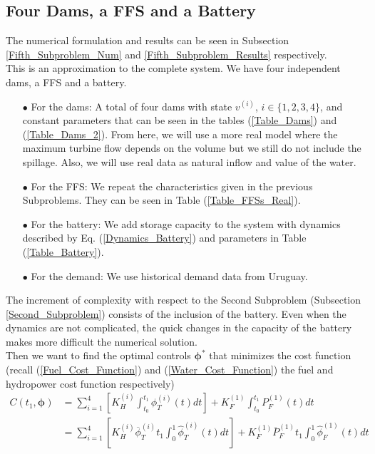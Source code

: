 \subsection{Four Dams, a FFS and a Battery} \label{Fifth_Subproblem}

The numerical formulation and results can be seen in Subsection \ref{Fifth_Subproblem_Num} and \ref{Fifth_Subproblem_Results} respectively.\\

This is an approximation to the complete system. We have four independent dams, a FFS and a battery.

\begin{enumerate}

\item[$\bullet$] For the dams: A total of four dams with state $v^{(i)}$, $i\in\{1,2,3,4\}$, and constant parameters  that can be seen in the tables (\ref{Table_Dams}) and (\ref{Table_Dams_2}). From here, we will use a more real model where the maximum turbine flow depends on the volume but we still do not include the spillage. Also, we will use real data as natural inflow and value of the water.

\item[$\bullet$] For the FFS: We repeat the characteristics given in the previous Subproblems. They can be seen in Table (\ref{Table_FFSs_Real}).

\item[$\bullet$] For the battery: We add storage capacity to the system with dynamics described by Eq. (\ref{Dynamics_Battery}) and parameters in Table (\ref{Table_Battery}).

\item[$\bullet$] For the demand: We use historical demand data from Uruguay.

\end{enumerate}
The increment of complexity with respect to the Second Subproblem (Subsection \ref{Second_Subproblem}) consists of the inclusion of the battery. Even when the dynamics are not complicated, the quick changes in the capacity of the battery makes more difficult the numerical solution.\\
Then we want to find the optimal controls $\bm{\phi}^*$ that minimizes the cost function (recall (\ref{Fuel_Cost_Function}) and (\ref{Water_Cost_Function}) the fuel and hydropower cost function respectively)
\begin{equation}
\begin{split}
C(t_1,\bm{\phi})&=\sum_{i=1}^4\left[K_H^{(i)}\int_{t_0}^{t_1}\phi_T^{(i)}(t)dt\right]+K_F^{(1)}\int_{t_0}^{t_1}P_F^{(1)}(t)dt\\
&=\sum_{i=1}^4\left[K_H^{(i)}\overline{\phi}_T^{(i)}t_1\int_{0}^{1}\hat{\phi}_T^{(i)}(t)dt\right]+K_F^{(1)}\overline{P}_F^{(1)}t_1\int_{0}^{1}\hat{\phi}_F^{(1)}(t)dt
\end{split}
\end{equation}
